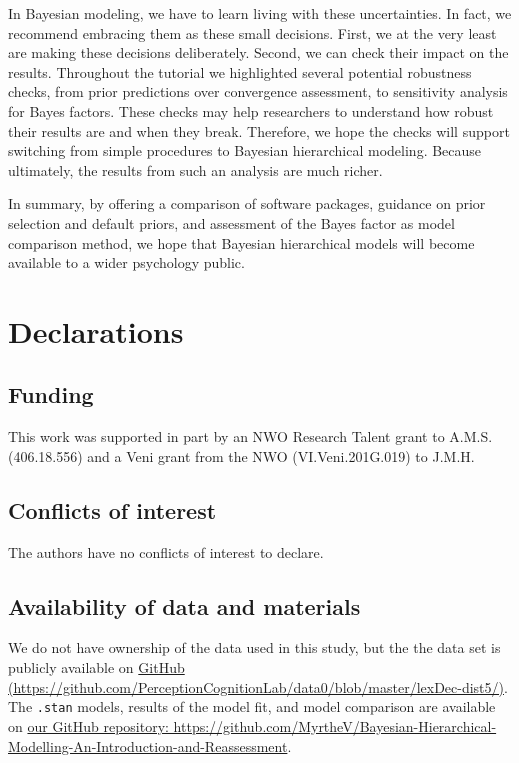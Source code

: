 \documentclass[
  english,
  doc,floatsintext]{apa6}
\begin{document}
In Bayesian modeling, we have to learn living with these uncertainties. In fact, we recommend embracing them as these small decisions. First, we at the very least are making these decisions deliberately. Second, we can check their impact on the results. Throughout the tutorial we highlighted several potential robustness checks, from prior predictions over convergence assessment, to sensitivity analysis for Bayes factors. These checks may help researchers to understand how robust their results are and when they break. Therefore, we hope the checks will support switching from simple procedures to Bayesian hierarchical modeling. Because ultimately, the results from such an analysis are much richer.

In summary, by offering a comparison of software packages, guidance on prior selection and default priors, and assessment of the Bayes factor as model comparison method, we hope that Bayesian hierarchical models will become available to a wider psychology public.

\newpage

\hypertarget{declarations}{%
\section{Declarations}\label{declarations}}

\hypertarget{funding}{%
\subsection{Funding}\label{funding}}

This work was supported in part by an NWO Research Talent grant to A.M.S. (406.18.556) and a Veni grant from the NWO (VI.Veni.201G.019) to J.M.H.

\hypertarget{conflicts-of-interest}{%
\subsection{Conflicts of interest}\label{conflicts-of-interest}}

The authors have no conflicts of interest to declare.

\hypertarget{availability-of-data-and-materials}{%
\subsection{Availability of data and materials}\label{availability-of-data-and-materials}}

We do not have ownership of the data used in this study, but the the data set is publicly available on \href{https://github.com/PerceptionCognitionLab/data0/blob/master/lexDec-dist5/}{GitHub (https://github.com/PerceptionCognitionLab/data0/blob/master/lexDec-dist5/)}. The \texttt{.stan} models, results of the model fit, and model comparison are available on \href{https://github.com/MyrtheV/Bayesian-Hierarchical-Modelling-An-Introduction-and-Reassessment}{our GitHub repository: https://github.com/MyrtheV/Bayesian-Hierarchical-Modelling-An-Introduction-and-Reassessment}.
\end{document}
